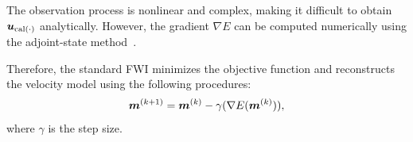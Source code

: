 The observation process is nonlinear and complex, making it difficult to obtain $\bm{u}_{\mathrm{cal}(\cdot)}$ analytically.
However, the gradient $\nabla E$ can be computed numerically using the adjoint-state method~\cite{FWI-gradient}.

Therefore, the standard FWI minimizes the objective function and reconstructs the velocity model using the following procedures:
\begin{equation} \label{eq:FWIWithGradient} \bm{m}^{(k+1)} = \bm{m}^{(k)} - \gamma( \nabla E(\bm{m}^{(k)}) ), \end{equation}
where $\gamma$ is the step size.

